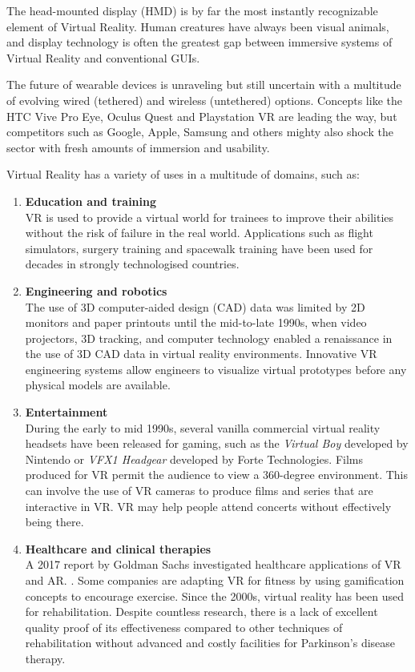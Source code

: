 \documentclass[12pt,a4paper,twoside]{report}
\begin{document}
The head-mounted display (HMD) is by far the most instantly recognizable element of Virtual Reality. Human creatures have always been visual animals, and display technology is often the greatest gap between immersive systems of Virtual Reality and conventional GUIs.

The future of wearable devices is unraveling but still uncertain with a multitude of evolving wired (tethered) and wireless (untethered) options. Concepts like the HTC Vive Pro Eye, Oculus Quest and Playstation VR are leading the way, but competitors such as Google, Apple, Samsung and others mighty also shock the sector with fresh amounts of immersion and usability.

Virtual Reality has a variety of uses in a multitude of domains, such as:

\begin{enumerate}
  \item \textbf{Education and training} \\
    VR is used to provide a virtual world for trainees to improve their abilities without the risk of failure in the real world. Applications such as flight simulators, surgery training and spacewalk training have been used for decades in strongly technologised countries. \cite{FlightSim}

  \item \textbf{Engineering and robotics} \\
    The use of 3D computer-aided design (CAD) data was limited by 2D monitors and paper printouts until the mid-to-late 1990s, when video projectors, 3D tracking, and computer technology enabled a renaissance in the use of 3D CAD data in virtual reality environments. Innovative VR engineering systems allow engineers to visualize virtual prototypes before any physical models are available. \cite{Bridges}

  \item \textbf{Entertainment} \\
    During the early to mid 1990s, several vanilla commercial virtual reality headsets have been released for gaming, such as the \textit{Virtual Boy} developed by Nintendo or \textit{VFX1 Headgear} developed by Forte Technologies. Films produced for VR permit the audience to view a 360-degree environment. This can involve the use of VR cameras to produce films and series that are interactive in VR. VR may help people attend concerts without effectively being there.

  \item \textbf{Healthcare and clinical therapies} \\
    A 2017 report by Goldman Sachs investigated healthcare applications of VR and AR. \cite{VRAR}. Some companies are adapting VR for fitness by using gamification concepts to encourage exercise. Since the 2000s, virtual reality has been used for rehabilitation. Despite countless research, there is a lack of excellent quality proof of its effectiveness compared to other techniques of rehabilitation without advanced and costly facilities for Parkinson's disease therapy. \cite{Parkinsons}


\end{enumerate}
\end{document}
